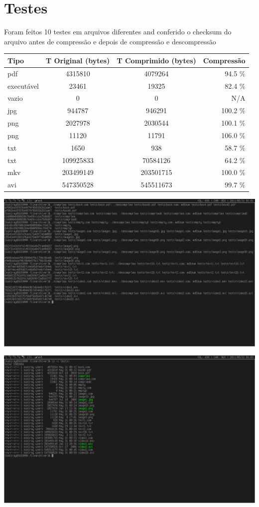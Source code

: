 \documentclass[a4paper, 11pt]{article}
\begin{document}
\section{Testes}
Foram feitos 10 testes em arquivos diferentes and conferido o checksum do arquivo antes de compressão e depois de compressão e descompressão
\begin{center}
\begin{tabular}{|l|c|c|r|}
\hline
Tipo & T Original (bytes) & T Comprimido (bytes) & Compressão\\
\hline
\hline
pdf & 4315810 & 4079264 & 94.5 \%\\
\hline
executável & 23461 & 19325 & 82.4 \%\\
\hline
vazio & 0 & 0 & N/A\\
\hline
jpg & 944787 & 946291 & 100.2 \%\\
\hline
png & 2027978 & 2030544 & 100.1 \%\\
\hline 
png & 11120 & 11791 & 106.0 \%\\
\hline
txt & 1650 & 938 & 58.7 \%\\
\hline
txt & 109925833 & 70584126 & 64.2 \%\\
\hline
mkv & 203499149 & 203501715 & 100.0 \%\\
\hline
avi & 547350528 & 545511673 & 99.7 \%\\
\hline
\end{tabular}
\linebreak
\newline
\newpage
\includegraphics[width=6.2in]{testMD5.png}

\includegraphics[width=6.2in]{testSize.png}
\end{center}
\end{document}
